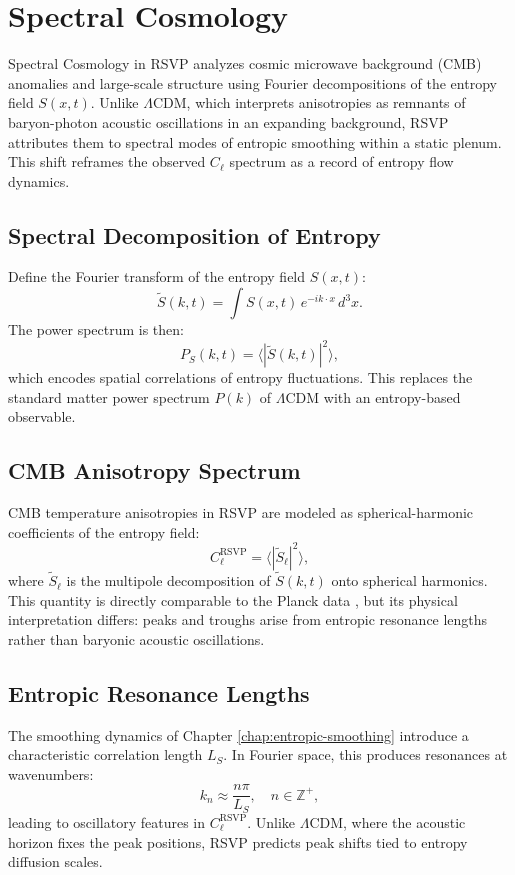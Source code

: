 \documentclass[12pt]{report}
\begin{document}
\chapter{Spectral Cosmology}
\label{chap:spectral-cosmology}
Spectral Cosmology in RSVP analyzes cosmic microwave background (CMB) anomalies and large-scale structure using Fourier decompositions of the entropy field \(S(x,t)\). Unlike \(\Lambda\)CDM, which interprets anisotropies as remnants of baryon-photon acoustic oscillations in an expanding background, RSVP attributes them to spectral modes of entropic smoothing within a static plenum. This shift reframes the observed \(C_\ell\) spectrum as a record of entropy flow dynamics.

\section{Spectral Decomposition of Entropy}
Define the Fourier transform of the entropy field \(S(x,t)\):
\begin{equation}
\tilde{S}(k,t) = \int S(x,t)\, e^{-i k \cdot x}\, d^3x. \label{eq:entropy-fourier}
\end{equation}
The power spectrum is then:
\begin{equation}
P_S(k,t) = \langle |\tilde{S}(k,t)|^2 \rangle,
\end{equation}
which encodes spatial correlations of entropy fluctuations. This replaces the standard matter power spectrum \(P(k)\) of \(\Lambda\)CDM with an entropy-based observable.

\section{CMB Anisotropy Spectrum}
CMB temperature anisotropies in RSVP are modeled as spherical-harmonic coefficients of the entropy field:
\begin{equation}
C_\ell^{\text{RSVP}} = \langle |\tilde{S}_\ell|^2 \rangle, \label{eq:spectrum}
\end{equation}
where \(\tilde{S}_\ell\) is the multipole decomposition of \(\tilde{S}(k,t)\) onto spherical harmonics. This quantity is directly comparable to the Planck data \citep{Planck2020}, but its physical interpretation differs: peaks and troughs arise from entropic resonance lengths rather than baryonic acoustic oscillations.

\section{Entropic Resonance Lengths}
The smoothing dynamics of Chapter \ref{chap:entropic-smoothing} introduce a characteristic correlation length \(L_S\). In Fourier space, this produces resonances at wavenumbers:
\begin{equation}
k_n \approx \frac{n\pi}{L_S}, \quad n \in \mathbb{Z}^+, \label{eq:resonances}
\end{equation}
leading to oscillatory features in \(C_\ell^{\text{RSVP}}\). Unlike \(\Lambda\)CDM, where the acoustic horizon fixes the peak positions, RSVP predicts peak shifts tied to entropy diffusion scales.
\end{document}
